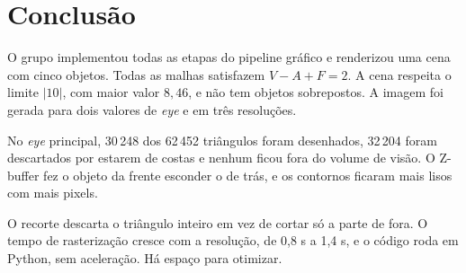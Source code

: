 \section{Conclusão}\label{sec:conclusao}

O grupo implementou todas as etapas do pipeline gráfico e renderizou uma cena com cinco objetos.
Todas as malhas satisfazem $V - A + F = 2$. A cena respeita o limite $|10|$, com maior valor
$8{,}46$, e não tem objetos sobrepostos. A imagem foi gerada para dois valores de \textit{eye} e em
três resoluções.

No \textit{eye} principal, 30\,248 dos 62\,452 triângulos foram desenhados, 32\,204 foram
descartados por estarem de costas e nenhum ficou fora do volume de visão.
O Z-buffer fez o objeto da frente esconder o de trás, e os contornos ficaram mais lisos com mais
pixels.

O recorte descarta o triângulo inteiro em vez de cortar só a parte de fora. O tempo de
rasterização cresce com a resolução, de 0,8 s a 1,4 s, e o código roda em Python, sem
aceleração. Há espaço para otimizar.
